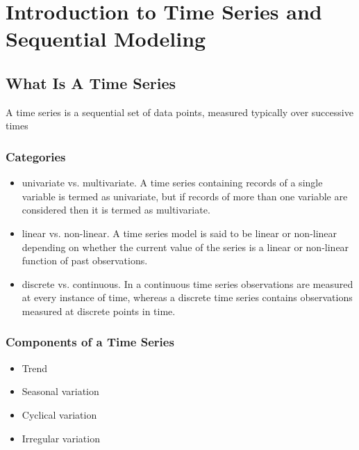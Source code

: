 
\chapter{Introduction to Time Series and Sequential Modeling} %

\label{Chapter1} %


\newcommand{\keyword}[1]{\textbf{#1}}
\newcommand{\tabhead}[1]{\textbf{#1}}
\newcommand{\code}[1]{\texttt{#1}}
\newcommand{\file}[1]{\texttt{\bfseries#1}}
\newcommand{\option}[1]{\texttt{\itshape#1}}


\section{What Is A Time Series}

A time series is a sequential set of data points, measured typically over successive times
\subsection{Categories}
\begin{itemize}
    \item univariate vs. multivariate. A time series containing records of a single variable is termed as univariate, but if records of more than one variable are considered then it is termed as multivariate.
    \item linear vs. non-linear. A time series model is said to be linear or non-linear depending on whether the current value of the series is a linear or non-linear function of past observations.
    \item discrete vs. continuous. In a continuous time series observations are measured at every instance of time, whereas a discrete time series contains
    observations measured at discrete points in time.
\end{itemize}
\subsection{Components of a Time Series}
\begin{itemize}
    \item Trend
    \item Seasonal variation
    \item Cyclical variation
    \item Irregular variation
\end{itemize}

